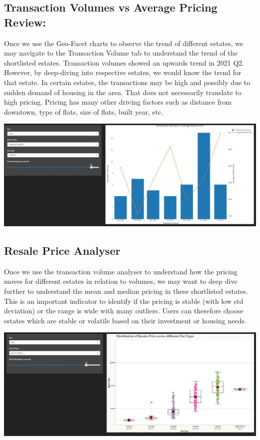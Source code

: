 \documentclass{acm_proc_article-sp}
\begin{document}
\hypertarget{transaction-volumes-vs-average-pricing-review}{%
\subsection{Transaction Volumes vs Average Pricing
Review:}\label{transaction-volumes-vs-average-pricing-review}}

Once we use the Geo-Facet charts to observe the trend of different
estates, we may navigate to the Transaction Volume tab to understand the
trend of the shortlisted estates. Transaction volumes showed an upwards
trend in 2021 Q2. However, by deep-diving into respective estates, we
would know the trend for that estate. In certain estates, the
transactions may be high and possibly due to sudden demand of housing in
the area. That does not necessarily translate to high pricing. Pricing
has many other driving factors such as distance from downtown, type of
flats, size of flats, built year, etc.

\includegraphics{IMG/img13.jpg}

\hypertarget{resale-price-analyser}{%
\subsection{Resale Price Analyser}\label{resale-price-analyser}}

Once we use the transaction volume analyser to understand how the
pricing moves for different estates in relation to volumes, we may want
to deep dive further to understand the mean and median pricing in these
shortlisted estates. This is an important indicator to identify if the
pricing is stable (with low std deviation) or the range is wide with
many outliers. Users can therefore choose estates which are stable or
volatile based on their investment or housing needs.

\includegraphics{IMG/img14.jpg}
\end{document}
